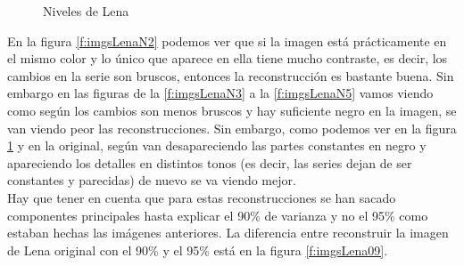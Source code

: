 \begin{figure}
 \centering
 \caption{Niveles de Lena}
 \label{f:imgsLenaN6}
\end{figure}

En la figura \ref{f:imgsLenaN2} podemos ver que si la imagen está prácticamente en el mismo color y lo único que aparece en ella tiene mucho contraste, es decir, los cambios en la serie son bruscos, entonces la reconstrucción es bastante buena. Sin embargo en las figuras de la \ref{f:imgsLenaN3} a la \ref{f:imgsLenaN5} vamos viendo como según los cambios son menos bruscos y hay suficiente negro en la imagen, se van viendo peor las reconstrucciones. Sin embargo, como podemos ver en la figura \ref{f:imgsLenaN6} y en la original, según van desapareciendo las partes constantes en negro y apareciendo los detalles en distintos tonos (es decir, las series dejan de ser constantes y parecidas) de nuevo se va viendo mejor.\\

Hay que tener en cuenta que para estas reconstrucciones se han sacado componentes principales hasta explicar el 90\% de varianza y no el 95\% como estaban hechas las imágenes anteriores. La diferencia entre reconstruir la imagen de Lena original con el 90\% y el 95\% está en la figura \ref{f:imgsLena09}.\\

